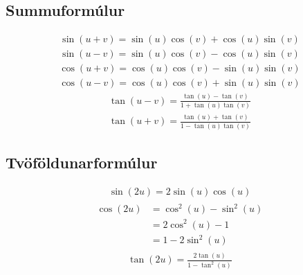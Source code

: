 \documentclass[a4paper,10pt,icelandic]{sphinxmanual}
\begin{document}
\subsection{Summuformúlur}
\label{\detokenize{Kafli07:summuformulur}}
\begin{equation*}
\begin{split}\sin( u + v ) = \sin(u)  \cos(v) + \cos(u) \sin(v)\end{split}
\end{equation*}
\begin{equation*}
\begin{split}\sin( u - v ) = \sin(u) \cos(v) - \cos(u) \sin(v)\end{split}
\end{equation*}
\begin{equation*}
\begin{split}\cos( u + v ) = \cos(u)  \cos(v) - \sin(u)  \sin(v)\end{split}
\end{equation*}
\begin{equation*}
\begin{split}\cos( u - v ) = \cos(u)  \cos(v) + \sin(u)  \sin(v)\end{split}
\end{equation*}
\begin{equation*}
\begin{split}\tan(u-v) = \frac{\tan(u) - \tan(v)}{1 + \tan(u)  \tan(v)}\end{split}
\end{equation*}
\begin{equation*}
\begin{split}\tan(u+v) = \frac{\tan(u) + \tan(v)}{1 - \tan(u)  \tan(v)}\end{split}
\end{equation*}

\subsection{Tvöföldunarformúlur}
\label{\detokenize{Kafli07:tvofoldunarformulur}}
\begin{equation*}
\begin{split}\sin(2u) = 2\sin(u)\cos(u)\end{split}
\end{equation*}
\begin{equation*}
\begin{split}\begin{aligned}
\cos(2u)&= \cos^2(u)-\sin^2(u) \\
&= 2\cos^2(u)-1 \\
&= 1-2 \sin^2(u)
\end{aligned}\end{split}
\end{equation*}
\begin{equation*}
\begin{split}\tan(2u) = \frac{2\tan(u)}{1-\tan^2(u)}\end{split}
\end{equation*}
\end{document}
